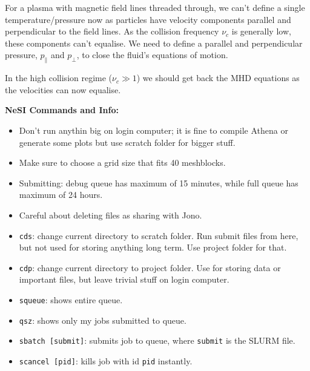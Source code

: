 \documentclass[12pt,letterpaper]{article}
\begin{document}
  For a plasma with magnetic field lines threaded through, we can't define a single temperature/pressure now as particles have velocity components parallel and perpendicular to the field lines. As the collision frequency $\nu_c$ is generally low, these components can't equalise. We need to define a parallel and perpendicular pressure, $p_\|$ and $p_\perp$, to close the fluid's equations of motion.

  In the high collision regime ($\nu_c \gg 1$) we should get back the MHD equations as the velocities can now equalise.

  \newpage

  \textbf{NeSI Commands and Info:}
  \begin{itemize}
    \item Don't run anythin big on login computer; it is fine to compile Athena or generate some plots but use scratch folder for bigger stuff.

    \item Make sure to choose a grid size that fits 40 meshblocks.

    \item Submitting: debug queue has maximum of 15 minutes, while full queue has maximum of 24 hours.

    \item Careful about deleting files as sharing with Jono.

    \item \verb|cds|: change current directory to scratch folder. Run submit files from here, but not used for storing anything long term. Use project folder for that.

    \item \verb|cdp|: change current directory to project folder. Use for storing data or important files, but leave trivial stuff on login computer.

    \item \verb|squeue|: shows entire queue.

    \item \verb|qsz|: shows only my jobs submitted to queue.

    \item \verb|sbatch [submit]|: submits job to queue, where \verb|submit| is the SLURM file.

    \item \verb|scancel [pid]|: kills job with id \verb|pid| instantly.
  \end{itemize}
\end{document}
